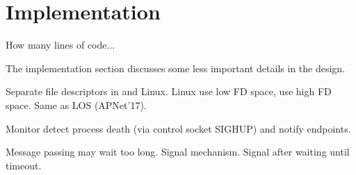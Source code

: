 \section{Implementation}
\label{sec:implementation}

How many lines of code...

The implementation section discusses some less important details in the design.

Separate file descriptors in \sys and Linux. Linux use low FD space, \sys use high FD space. Same as LOS (APNet'17).

Monitor detect process death (via control socket SIGHUP) and notify endpoints.

Message passing may wait too long.
Signal mechanism. Signal after waiting until timeout.
